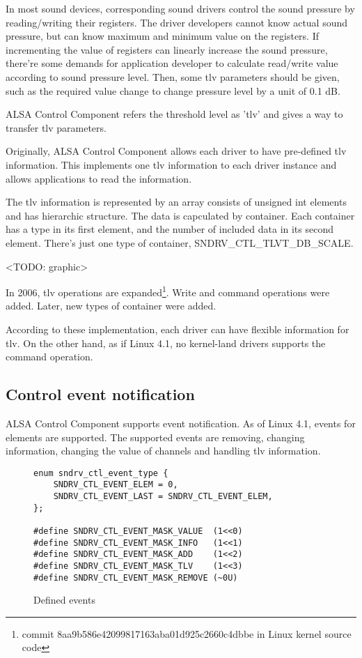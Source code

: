 \documentclass[onecolumn]{article}
\begin{document}
In most sound devices, corresponding sound drivers control the sound pressure by reading/writing their registers. The driver developers cannot know actual sound pressure, but can know maximum and minimum value on the registers. If incrementing the value of registers can linearly increase the sound pressure, there're some demands for application developer to calculate read/write value according to sound pressure level. Then, some tlv parameters should be given, such as the required value change to change pressure level by a unit of 0.1 dB.

ALSA Control Component refers the threshold level as 'tlv' and gives a way to transfer tlv parameters.

Originally, ALSA Control Component allows each driver to have pre-defined tlv information. This implements one tlv information to each driver instance and allows applications to read the information.

The tlv information is represented by an array consists of unsigned int elements and  has hierarchic structure. The data is capculated by container. Each container has a type in its first element, and the number of included data in its second element. There's just one type of container, SNDRV\_CTL\_TLVT\_DB\_SCALE.

<TODO: graphic>

In 2006, tlv operations are expanded\footnote{commit 8aa9b586e42099817163aba01d925c2660c4dbbe in Linux kernel source code}. Write and command operations were added. Later, new types of container were added.

According to these implementation, each driver can have flexible information for tlv. On the other hand, as if Linux 4.1, no kernel-land drivers supports the command operation.


\subsection{Control event notification}

ALSA Control Component supports event notification. As of Linux 4.1, events for elements are supported. The supported events are removing, changing information, changing the value of channels and handling tlv information.

\begin{figure}[htbp]
\small
\begin{verbatim}
enum sndrv_ctl_event_type {
    SNDRV_CTL_EVENT_ELEM = 0,
    SNDRV_CTL_EVENT_LAST = SNDRV_CTL_EVENT_ELEM,
};

#define SNDRV_CTL_EVENT_MASK_VALUE  (1<<0)
#define SNDRV_CTL_EVENT_MASK_INFO   (1<<1)
#define SNDRV_CTL_EVENT_MASK_ADD    (1<<2)
#define SNDRV_CTL_EVENT_MASK_TLV    (1<<3)
#define SNDRV_CTL_EVENT_MASK_REMOVE (~0U)
\end{verbatim}
\caption{{Defined events}}
\label{defined-events}
\end{figure}
\end{document}
